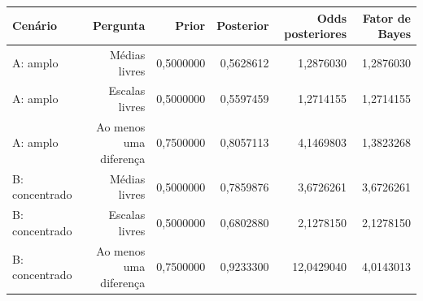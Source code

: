 \begin{tabular}{lrrrrr}
\toprule
Cenário & Pergunta & Prior & Posterior & Odds posteriores & Fator de Bayes \\
\midrule
A: amplo & Médias livres & 0,5000000 & 0,5628612 & 1,2876030 & 1,2876030 \\
A: amplo & Escalas livres & 0,5000000 & 0,5597459 & 1,2714155 & 1,2714155 \\
A: amplo & Ao menos uma diferença & 0,7500000 & 0,8057113 & 4,1469803 & 1,3823268 \\
B: concentrado & Médias livres & 0,5000000 & 0,7859876 & 3,6726261 & 3,6726261 \\
B: concentrado & Escalas livres & 0,5000000 & 0,6802880 & 2,1278150 & 2,1278150 \\
B: concentrado & Ao menos uma diferença & 0,7500000 & 0,9233300 & 12,0429040 & 4,0143013 \\
\bottomrule
\end{tabular}
